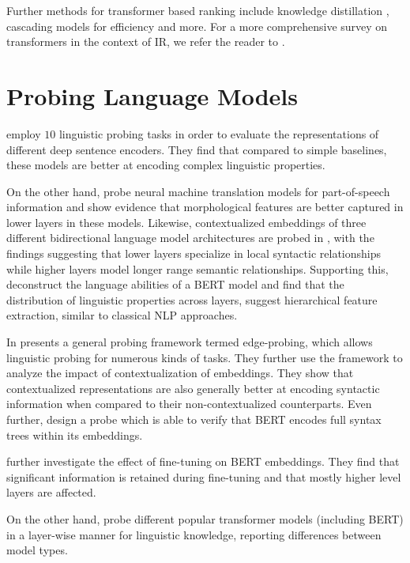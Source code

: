 Further methods for transformer based ranking include knowledge distillation \cite{DBLP:journals/corr/abs-2009-07531, DBLP:journals/corr/abs-2010-02666}, cascading models for efficiency \cite{Nogueira2019MultiStageDR} and more. For a more comprehensive survey on transformers in the context of IR, we refer the reader to \cite{10.1145/3437963.3441667}.

\section{Probing Language Models}
\cite{conneau-etal-2018-cram} employ $10$ linguistic probing tasks in order to evaluate the representations of different deep sentence encoders. They find that compared to simple baselines, these models are better at encoding complex linguistic properties.

On the other hand, \cite{Belinkov2017WhatDN} probe neural machine translation models for part-of-speech information and show evidence that morphological features are better captured in lower layers in these models. Likewise, contextualized embeddings of three different bidirectional language model architectures are probed in \cite{peters-etal-2018-dissecting}, with the findings suggesting that lower layers specialize in local syntactic relationships while higher layers model longer range semantic relationships. Supporting this, \cite{tenney-etal-2019-bert} deconstruct the language abilities of a BERT model and find that the distribution of linguistic properties across layers, suggest hierarchical feature extraction, similar to classical NLP approaches.

In \cite{Tenney2019WhatDY} presents a general probing framework termed edge-probing, which allows linguistic probing for numerous kinds of tasks. They further use the framework to analyze the impact of contextualization of embeddings. They show that contextualized representations are also generally better at encoding syntactic information when compared to their non-contextualized counterparts. Even further, \cite{Hewitt2019ASP} design a probe which is able to verify that BERT encodes full syntax trees within its embeddings.

\cite{merchant-etal-2020-happens} further investigate the effect of fine-tuning on BERT embeddings. They find that significant information is retained during fine-tuning and that mostly higher level layers are affected.

On the other hand, \cite{Fayyaz2021NotAM} probe different popular transformer models (including BERT) in a layer-wise manner for linguistic knowledge, reporting differences between model types.

